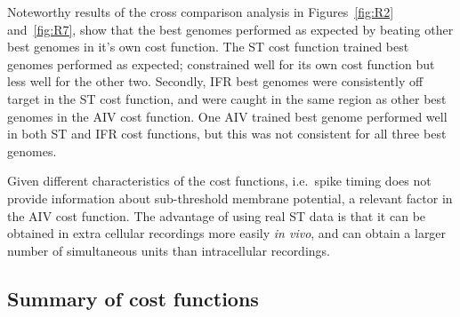 \smallskip{}


Noteworthy results of the cross comparison analysis in Figures~\ref{fig:R2}
and~\ref{fig:R7}, show that the best genomes performed as expected by
beating other best genomes in it's own cost function. The ST cost function
trained best genomes performed as expected; constrained well for its own
cost function but less well for the other two. Secondly, IFR best genomes
were consistently off target in the ST cost function, and were caught in
the same region as other best genomes in the AIV cost function. One AIV
trained best genome performed well in both ST and IFR cost functions, but
this was not consistent for all three best genomes.

Given different characteristics of the cost functions, i.e.\ spike timing
does not provide information about sub-threshold membrane potential, a
relevant factor in the AIV cost function.  The advantage of using real ST
data is that it can be obtained in extra cellular recordings more easily
\textit{in vivo}, and can obtain a larger number of simultaneous units than
intracellular recordings.



\subsection{Summary of cost functions}\label{sec:GA:summ-cost-funct}

